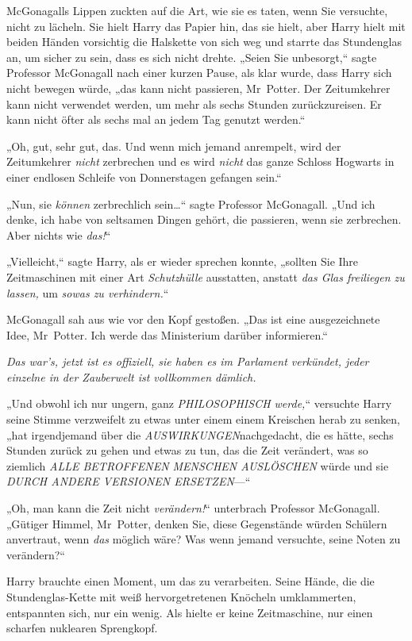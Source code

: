 {McGonagalls Lippen zuckten auf die Art, wie sie es taten, wenn Sie versuchte, nicht zu lächeln. Sie hielt Harry das Papier hin, das sie hielt, aber Harry hielt mit beiden Händen vorsichtig die Halskette von sich weg und starrte das Stundenglas an, um sicher zu sein, dass es sich nicht drehte. „Seien Sie unbesorgt,“ sagte Professor McGonagall nach einer kurzen Pause, als klar wurde, dass Harry sich nicht bewegen würde, „das kann nicht passieren, Mr~Potter. Der Zeitumkehrer kann nicht verwendet werden, um mehr als sechs Stunden zurückzureisen. Er kann nicht öfter als sechs mal an jedem Tag genutzt werden.“

„Oh, gut, sehr gut, das. Und wenn mich jemand anrempelt, wird der Zeitumkehrer \emph{nicht} zerbrechen und es wird \emph{nicht} das ganze Schloss Hogwarts in einer endlosen Schleife von Donnerstagen gefangen sein.“

„Nun, sie \emph{können} zerbrechlich sein…“ sagte Professor McGonagall. „Und ich denke, ich habe von seltsamen Dingen gehört, die passieren, wenn sie zerbrechen. Aber nichts wie \emph{das!}“

„Vielleicht,“ sagte Harry, als er wieder sprechen konnte, „sollten Sie Ihre Zeitmaschinen mit einer Art \emph{Schutzhülle} ausstatten, anstatt \emph{das Glas freiliegen zu lassen,} um \emph{sowas zu verhindern.}“

McGonagall sah aus wie vor den Kopf gestoßen. „Das ist eine ausgezeichnete Idee, Mr~Potter. Ich werde das Ministerium darüber informieren.“

\emph{Das war's, jetzt ist es offiziell, sie haben es im Parlament verkündet, jeder einzelne in der Zauberwelt ist vollkommen dämlich.}

„Und obwohl ich nur ungern, ganz \emph{PHILOSOPHISCH werde,}“ versuchte Harry seine Stimme verzweifelt zu etwas unter einem einem Kreischen herab zu senken, „hat irgendjemand über die \emph{AUSWIRKUNGEN}nachgedacht, die es hätte, sechs Stunden zurück zu gehen und etwas zu tun, das die Zeit verändert, was so ziemlich \emph{ALLE BETROFFENEN MENSCHEN AUSLÖSCHEN} würde und sie \emph{DURCH ANDERE VERSIONEN ERSETZEN}—“

„Oh, man kann die Zeit nicht \emph{verändern!}“ unterbrach Professor McGonagall. „Gütiger Himmel, Mr~Potter, denken Sie, diese Gegenstände würden Schülern anvertraut, wenn \emph{das} möglich wäre? Was wenn jemand versuchte, seine Noten zu verändern?“

Harry brauchte einen Moment, um das zu verarbeiten. Seine Hände, die die Stundenglas-Kette mit weiß hervorgetretenen Knöcheln umklammerten, entspannten sich, nur ein wenig. Als hielte er keine Zeitmaschine, nur einen scharfen nuklearen Sprengkopf.

}
